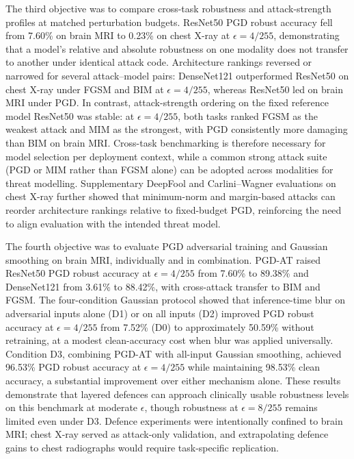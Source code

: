 \documentclass[12pt,a4paper,oneside]{report}
\begin{document}
The third objective was to compare cross-task robustness and attack-strength profiles at matched perturbation budgets. ResNet50 PGD robust accuracy fell from 7.60\% on brain MRI to 0.23\% on chest X-ray at $\epsilon = 4/255$, demonstrating that a model's relative and absolute robustness on one modality does not transfer to another under identical attack code. Architecture rankings reversed or narrowed for several attack--model pairs: DenseNet121 outperformed ResNet50 on chest X-ray under FGSM and BIM at $\epsilon = 4/255$, whereas ResNet50 led on brain MRI under PGD. In contrast, attack-strength ordering on the fixed reference model ResNet50 was stable: at $\epsilon = 4/255$, both tasks ranked FGSM as the weakest attack and MIM as the strongest, with PGD consistently more damaging than BIM on brain MRI. Cross-task benchmarking is therefore necessary for model selection per deployment context, while a common strong attack suite (PGD or MIM rather than FGSM alone) can be adopted across modalities for threat modelling. Supplementary DeepFool and Carlini--Wagner evaluations on chest X-ray further showed that minimum-norm and margin-based attacks can reorder architecture rankings relative to fixed-budget PGD, reinforcing the need to align evaluation with the intended threat model.

The fourth objective was to evaluate PGD adversarial training and Gaussian smoothing on brain MRI, individually and in combination. PGD-AT raised ResNet50 PGD robust accuracy at $\epsilon = 4/255$ from 7.60\% to 89.38\% and DenseNet121 from 3.61\% to 88.42\%, with cross-attack transfer to BIM and FGSM. The four-condition Gaussian protocol showed that inference-time blur on adversarial inputs alone (D1) or on all inputs (D2) improved PGD robust accuracy at $\epsilon = 4/255$ from 7.52\% (D0) to approximately 50.59\% without retraining, at a modest clean-accuracy cost when blur was applied universally. Condition D3, combining PGD-AT with all-input Gaussian smoothing, achieved 96.53\% PGD robust accuracy at $\epsilon = 4/255$ while maintaining 98.53\% clean accuracy, a substantial improvement over either mechanism alone. These results demonstrate that layered defences can approach clinically usable robustness levels on this benchmark at moderate $\epsilon$, though robustness at $\epsilon = 8/255$ remains limited even under D3. Defence experiments were intentionally confined to brain MRI; chest X-ray served as attack-only validation, and extrapolating defence gains to chest radiographs would require task-specific replication.
\end{document}
